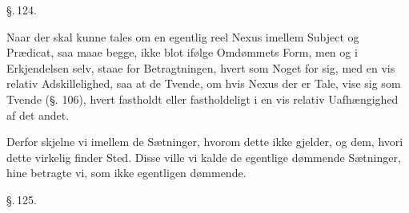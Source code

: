 \documentclass[12pt]{book}
\def\textit#1{#1}%
\def\emph#1{#1}%
\newcommand{\parag}[1]{%
  \par\vspace{0.9\baselineskip}%
  {\centering\textit{\S.\,#1.}\par}%
  \vspace{0.35\baselineskip}%
  \noindent\hspace{\parindent}\ignorespaces
}
\newcommand{\opage}[1]{\marginnote{\footnotesize\textit{[#1]}}}
\begin{document}
\parag{124}

Naar der skal kunne tales om en egentlig \emph{reel Nexus} imellem Subject og
Prædicat, saa maae begge, ikke blot ifølge Omdømmets Form, men og i Erkjendelsen
selv, staae for Betragtningen, hvert som Noget for sig, med en vis relativ
Adskillelighed, saa at de Tvende, om hvis Nexus der er Tale, vise sig som Tvende
(§. 106), hvert fastholdt eller fastholdeligt i en vis relativ Uafhængighed af
det andet.

Derfor skjelne vi imellem de Sætninger, hvorom dette ikke gjelder, og dem, hvori
dette virkelig finder Sted. Disse ville vi kalde de \emph{egentlige dømmende
Sætninger}, hine betragte vi, som \emph{ikke egentligen dømmende}.

\opage{301} \parag{125}
\end{document}
